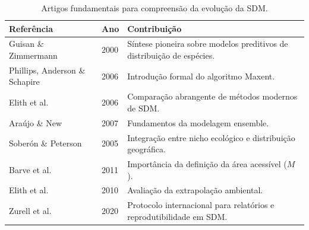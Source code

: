 \begin{table}[H]
	\centering
	\caption{Artigos fundamentais para compreensão da evolução da SDM.}
	\label{tab:artigos_classicos_sdm}
	
	\small
	
	\begin{tabular}{
			p{}
			p{}
			p{}
		}
		
		\toprule
		
		\textbf{Referência} &
		\textbf{Ano} &
		\textbf{Contribuição}
		
		\\
		\midrule
		
		Guisan \& Zimmermann &
		2000 &
		Síntese pioneira sobre modelos preditivos de distribuição de espécies.
		
		\\
		
		Phillips, Anderson \& Schapire &
		2006 &
		Introdução formal do algoritmo Maxent.
		
		\\
		
		Elith et al. &
		2006 &
		Comparação abrangente de métodos modernos de SDM.
		
		\\
		
		Araújo \& New &
		2007 &
		Fundamentos da modelagem ensemble.
		
		\\
		
		Soberón \& Peterson &
		2005 &
		Integração entre nicho ecológico e distribuição geográfica.
		
		\\
		
		Barve et al. &
		2011 &
		Importância da definição da área acessível ($M$).
		
		\\
		
		Elith et al. &
		2010 &
		Avaliação da extrapolação ambiental.
		
		\\
		
		Zurell et al. &
		2020 &
		Protocolo internacional para relatórios e reprodutibilidade em SDM.
		
		\\
		
		\bottomrule
		
	\end{tabular}
	
\end{table}

